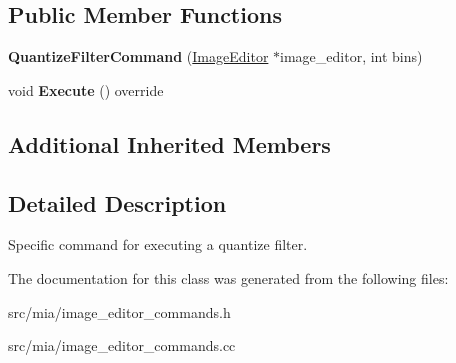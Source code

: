\subsection*{Public Member Functions}
\begin{DoxyCompactItemize}
\item 
\mbox{\label{classimage__tools_1_1QuantizeFilterCommand_a47f3c67d8fffc4fe2be5999373bfb786}} 
{\bfseries Quantize\+Filter\+Command} (\hyperlink{classimage__tools_1_1ImageEditor}{Image\+Editor} $\ast$image\+\_\+editor, int bins)
\item 
\mbox{\label{classimage__tools_1_1QuantizeFilterCommand_a02b071572e9d690e636311ee633d6db4}} 
void {\bfseries Execute} () override
\end{DoxyCompactItemize}
\subsection*{Additional Inherited Members}


\subsection{Detailed Description}
Specific command for executing a quantize filter. 

The documentation for this class was generated from the following files\+:\begin{DoxyCompactItemize}
\item 
src/mia/image\+\_\+editor\+\_\+commands.\+h\item 
src/mia/image\+\_\+editor\+\_\+commands.\+cc\end{DoxyCompactItemize}
